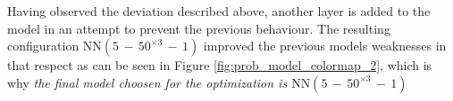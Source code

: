\documentclass[preprint,12pt]{elsarticle}
\begin{document}

Having observed the deviation described above, another layer is added to the model in an attempt to prevent the previous behaviour. The resulting configuration $\text{NN}(5\,{-}\,50^{\times3}\,{-}\,1)$ improved the previous models weaknesses in that respect as can be seen in Figure \ref{fig:prob_model_colormap_2}, which is why \textit{the final model choosen for the optimization is  $\text{NN}(5\,{-}\,50^{\times3}\,{-}\,1)$}
%
\end{document}
